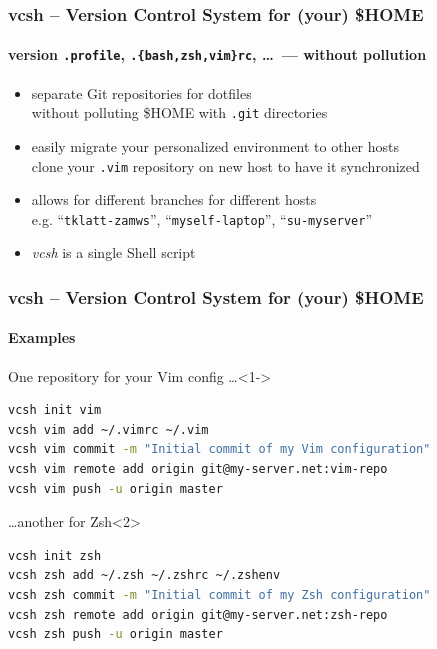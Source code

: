 \documentclass[english,hyperref={pdfpagelabels=false},aspectratio=169]{beamer}
\begin{document}
\begin{frame}[label=vcsh]
  \frametitle{vcsh -- Version Control System for (your) \$HOME}
  \framesubtitle{version \texttt{.profile}, \texttt{.\{bash,zsh,vim\}rc}, \dots~--- without pollution}
  \begin{itemize}
    \item separate Git repositories for dotfiles\\
      {\scriptsize without polluting \$HOME with \texttt{.git} directories}
    \item easily migrate your personalized environment to other hosts\\
      {\scriptsize clone your \texttt{.vim} repository on new host to have it synchronized}
    \item allows for different branches for different hosts\\
      {\scriptsize e.g. ``\texttt{tklatt-zamws}'', ``\texttt{myself-laptop}'', ``\texttt{su-myserver}''}
    \item \textit{vcsh} is a single Shell script
  \end{itemize}
\end{frame}

\begin{frame}[fragile]
  \frametitle{vcsh -- Version Control System for (your) \$HOME}
  \framesubtitle{Examples}
  \begin{block}{One repository for your Vim config \dots}<1->
    \vspace{-0.75em}
    \begin{lstlisting}[language=zsh]
vcsh init vim
vcsh vim add ~/.vimrc ~/.vim
vcsh vim commit -m "Initial commit of my Vim configuration"
vcsh vim remote add origin git@my-server.net:vim-repo
vcsh vim push -u origin master
    \end{lstlisting}
    \vspace{-0.75em}
  \end{block}
  \begin{block}{\dots another for Zsh}<2>
    \vspace{-0.75em}
    \begin{lstlisting}[language=zsh]
vcsh init zsh
vcsh zsh add ~/.zsh ~/.zshrc ~/.zshenv
vcsh zsh commit -m "Initial commit of my Zsh configuration"
vcsh zsh remote add origin git@my-server.net:zsh-repo
vcsh zsh push -u origin master
    \end{lstlisting}
    \vspace{-0.75em}
  \end{block}
\end{frame}
\end{document}
